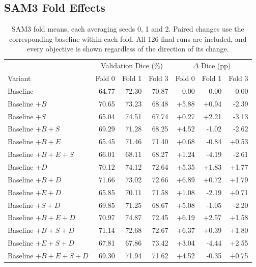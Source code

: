 \subsection{SAM3 Fold Effects}

\begin{table}[htbp]
\centering\small{}
\setlength{\tabcolsep}{5pt}
\renewcommand{\arraystretch}{1.12}
\begin{tabular}{@{}lrrrrrr@{}}
\hline
 & \multicolumn{3}{c}{Validation Dice (\%)} & \multicolumn{3}{c}{$\Delta$ Dice (pp)} \\
Variant & Fold 0 & Fold 1 & Fold 3 & Fold 0 & Fold 1 & Fold 3 \\
\hline
Baseline & 64.77 & 72.30 & 70.87 & 0.00 & 0.00 & 0.00 \\
Baseline $+B$ & 70.65 & 73.23 & 68.48 & +5.88 & +0.94 & -2.39 \\
Baseline $+S$ & 65.04 & 74.51 & 67.74 & +0.27 & +2.21 & -3.13 \\
Baseline $+B+S$ & 69.29 & 71.28 & 68.25 & +4.52 & -1.02 & -2.62 \\
Baseline $+B+E$ & 65.45 & 71.46 & 71.40 & +0.68 & -0.84 & +0.53 \\
Baseline $+B+E+S$ & 66.01 & 68.11 & 68.27 & +1.24 & -4.19 & -2.61 \\
Baseline $+D$ & 70.12 & 74.12 & 72.64 & +5.35 & +1.83 & +1.77 \\
Baseline $+B+D$ & 71.66 & 73.02 & 72.66 & +6.89 & +0.72 & +1.79 \\
Baseline $+E+D$ & 65.85 & 70.11 & 71.58 & +1.08 & -2.19 & +0.71 \\
Baseline $+S+D$ & 69.85 & 71.25 & 68.67 & +5.08 & -1.05 & -2.20 \\
Baseline $+B+E+D$ & 70.97 & 74.87 & 72.45 & +6.19 & +2.57 & +1.58 \\
Baseline $+B+S+D$ & 71.14 & 72.68 & 72.67 & +6.37 & +0.39 & +1.80 \\
Baseline $+E+S+D$ & 67.81 & 67.86 & 73.42 & +3.04 & -4.44 & +2.55 \\
Baseline $+B+E+S+D$ & 69.30 & 71.94 & 71.62 & +4.52 & -0.35 & +0.75 \\
\hline
\end{tabular}
\caption{SAM3 fold means, each averaging seeds 0, 1 and 2. Paired changes
use the corresponding baseline within each fold. All 126 final runs
are included, and every objective is shown regardless of the direction
of its change.}
\label{tab:sam3-geo-folds}
\end{table}

